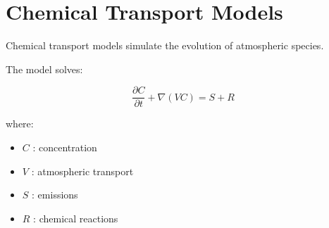 \section{Chemical Transport Models}


Chemical transport models simulate the evolution of atmospheric
species.



The model solves:


\begin{equation}
\frac{\partial C}{\partial t}
+
\nabla(V C)
=
S
+
R
\end{equation}



where:


\begin{itemize}

\item $C$ : concentration

\item $V$ : atmospheric transport

\item $S$ : emissions

\item $R$ : chemical reactions

\end{itemize}
